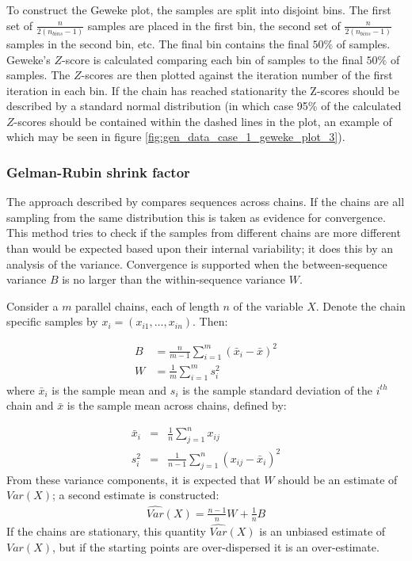 \documentclass[12pt]{article} %
\begin{document}
	To construct the Geweke plot, the samples are split into disjoint bins. The first set of $\frac{n}{2(n_{bins} -1)}$ samples are placed in the first bin, the second set of $\frac{n}{2(n_{bins} -1)}$ samples in the second bin, etc. The final bin contains the final $50\%$ of samples. Geweke's $Z$-score is calculated comparing each bin of samples to the final $50\%$ of samples. The $Z$-scores are then plotted against the iteration number of the first iteration in each bin. If the chain has reached stationarity the Z-scores should be described by a standard normal distribution (in which case 95\% of the calculated $Z$-scores should be contained within the dashed lines in the plot, an example of which may be seen in figure \ref{fig:gen_data_case_1_geweke_plot_3}).
	
	
	\subsubsection{Gelman-Rubin shrink factor}
	\label{sec:additional_theory:sub_sec:convergence:sub_sub_sec:gelman}
	The approach described by \citet{GelmanInferenceIterativeSimulation1992} compares sequences across chains. If the chains are all sampling from the same distribution this is taken as evidence for convergence. This method tries to check if the samples from different chains are more different than would be expected based upon their internal variability; it does this by an analysis of the variance. Convergence is supported when the between-sequence variance $B$ is no larger than the within-sequence variance $W$.
	
	Consider a $m$ parallel chains, each of length $n$ of the variable $X$. Denote the chain specific samples by $x_i = (x_{i1},\ldots,x_{in})$. Then:
	
	\begin{align}
	B &= \frac{n}{m-1}\sum_{i=1}^m (\bar{x}_i - \bar{x})^2 \\
	W &= \frac{1}{m}\sum_{i=1}^m s_i^2
	\end{align}
	where $\bar{x}_i$ is the sample mean and $s_i$ is the sample standard deviation of the $i^{th}$ chain and $\bar{x}$ is the sample mean across chains, defined by:
	
	\begin{eqnarray} \label{eqn:sample_parameters}
	\bar{x}_i &=& \frac{1}{n}\sum_{j=1}^n x_{ij} \\
	s_i^2 &=& \frac{1}{n - 1}\sum_{j=1}^n \left( x_{ij} - \bar{x}_i \right) ^2 
	\end{eqnarray}
	From these variance components, it is expected that $W$ should be an estimate of $Var(X)$; a second estimate is constructed:
	\begin{align}
	\hat{Var}(X) = \frac{n-1}{n}W + \frac{1}{n}B
	\end{align}
	If the chains are stationary, this quantity $\hat{Var}(X)$ is an unbiased estimate of $Var(X)$, but if the starting points are over-dispersed it is an over-estimate.
	
\end{document}
